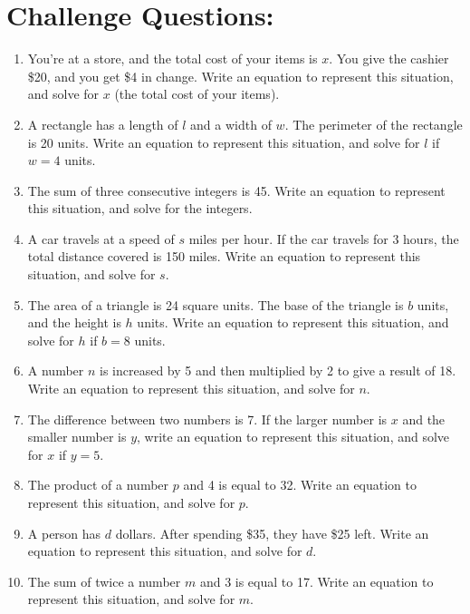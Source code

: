 \section{Challenge Questions:}
\begin{enumerate}[label=(\alph*)]
    \item You’re at a store, and the total cost of your items is $x$. You give the cashier \$20, and you get \$4 in change. Write an equation to represent this situation, and solve for $x$ (the total cost of your items).
    \item A rectangle has a length of $l$ and a width of $w$. The perimeter of the rectangle is 20 units. Write an equation to represent this situation, and solve for $l$ if $w = 4$ units.
    \item The sum of three consecutive integers is 45. Write an equation to represent this situation, and solve for the integers.
    \item A car travels at a speed of $s$ miles per hour. If the car travels for 3 hours, the total distance covered is 150 miles. Write an equation to represent this situation, and solve for $s$.
    \item The area of a triangle is 24 square units. The base of the triangle is $b$ units, and the height is $h$ units. Write an equation to represent this situation, and solve for $h$ if $b = 8$ units.
    \item A number $n$ is increased by 5 and then multiplied by 2 to give a result of 18. Write an equation to represent this situation, and solve for $n$.
    \item The difference between two numbers is 7. If the larger number is $x$ and the smaller number is $y$, write an equation to represent this situation, and solve for $x$ if $y = 5$.
    \item The product of a number $p$ and 4 is equal to 32. Write an equation to represent this situation, and solve for $p$.
    \item A person has $d$ dollars. After spending \$35, they have \$25 left. Write an equation to represent this situation, and solve for $d$.
    \item The sum of twice a number $m$ and 3 is equal to 17. Write an equation to represent this situation, and solve for $m$.
\end{enumerate}